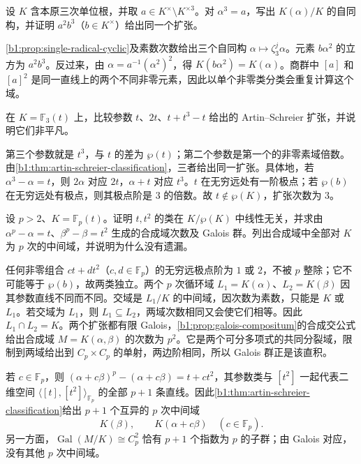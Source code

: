 \begin{exercise}\label{b1:ex:20-10}
	设 \(K\) 含本原三次单位根，并取 \(a\in K^\times\setminus K^{\times3}\)。对 \(\alpha^3=a\)，写出 \(K(\alpha)/K\) 的自同构，并证明 \(a^2b^3\)（\(b\in K^\times\)）给出同一个扩张。
\end{exercise}
\begin{solution}
	\cref{b1:prop:single-radical-cyclic}及素数次数给出三个自同构 \(\alpha\mapsto\zeta_3^j\alpha\)。元素 \(b\alpha^2\) 的立方为 \(a^2b^3\)。反过来，由 \(\alpha=a^{-1}(\alpha^2)^2\)，得 \(K(b\alpha^2)=K(\alpha)\)。商群中 \([a]\) 和 \([a]^2\) 是同一直线上的两个不同非零元素，因此以单个非零类分类会重复计算这个域。
\end{solution}

\begin{exercise}\label{b1:ex:20-11}
	在 \(K=\mathbb F_3(t)\) 上，比较参数 \(t\)、\(2t\)、\(t+t^3-t\) 给出的 Artin--Schreier 扩张，并说明它们非平凡。
\end{exercise}
\begin{solution}
	第三个参数就是 \(t^3\)，与 \(t\) 的差为 \(\wp(t)\)；第二个参数是第一个的非零素域倍数。由\cref{b1:thm:artin-schreier-classification}，三者给出同一扩张。具体地，若 \(\alpha^3-\alpha=t\)，则 \(2\alpha\) 对应 \(2t\)，\(\alpha+t\) 对应 \(t^3\)。\(t\) 在无穷远处有一阶极点；若 \(\wp(b)\) 在无穷远处有极点，则其极点阶是 \(3\) 的倍数。故 \(t\notin\wp(K)\)，扩张次数为 \(3\)。
\end{solution}

\begin{exercise}\label{b1:ex:20-12}
	设 \(p>2\)、\(K=\mathbb F_p(t)\)。证明 \(t,t^2\) 的类在 \(K/\wp(K)\) 中线性无关，并求由 \(\alpha^p-\alpha=t\)、\(\beta^p-\beta=t^2\) 生成的合成域次数及 Galois 群。列出合成域中全部对 \(K\) 为 \(p\) 次的中间域，并说明为什么没有遗漏。
\end{exercise}
\begin{solution}
	任何非零组合 \(ct+dt^2\)（\(c,d\in\mathbb F_p\)）的无穷远极点阶为 \(1\) 或 \(2\)，不被 \(p\) 整除；它不可能等于 \(\wp(b)\)，故两类独立。两个 \(p\) 次循环域 \(L_1=K(\alpha)\)、\(L_2=K(\beta)\) 因其参数直线不同而不同。交域是 \(L_1/K\) 的中间域，因次数为素数，只能是 \(K\) 或 \(L_1\)。若交域为 \(L_1\)，则 \(L_1\subseteq L_2\)，两域次数相同又会使它们相等。因此 \(L_1\cap L_2=K\)。两个扩张都有限 Galois，\cref{b1:prop:galois-compositum}的合成交公式给出合成域 \(M=K(\alpha,\beta)\) 的次数为 \(p^2\)。它是两个可分多项式的共同分裂域，限制到两域给出到 \(C_p\times C_p\) 的单射，两边阶相同，所以 Galois 群正是该直积。

	若 \(c\in\mathbb F_p\)，则 \((\alpha+c\beta)^p-(\alpha+c\beta)=t+ct^2\)，其参数类与 \([t^2]\) 一起代表二维空间 \(\langle[t],[t^2]\rangle_{\mathbb F_p}\) 的全部 \(p+1\) 条直线。因此\cref{b1:thm:artin-schreier-classification}给出 \(p+1\) 个互异的 \(p\) 次中间域
	\[
		K(\beta),\qquad K(\alpha+c\beta)\quad(c\in\mathbb F_p).
	\]
	另一方面，\(\operatorname{Gal}(M/K)\cong C_p^2\) 恰有 \(p+1\) 个指数为 \(p\) 的子群；由 Galois 对应，没有其他 \(p\) 次中间域。
\end{solution}

